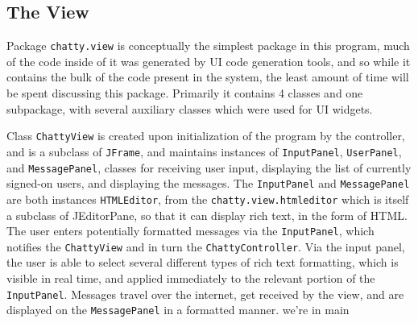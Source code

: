 \documentclass[oneside,article]{memoir}
\begin{document}
\subsection{The View}
\label{theview}

Package \texttt{chatty.view} is conceptually the simplest package in this
program, much of the code inside of it was generated by UI code
generation tools, and so while it contains the bulk of the code
present in the system, the least amount of time will be spent
discussing this package. Primarily it contains 4 classes and one
subpackage, with several auxiliary classes which were used for UI
widgets.

Class \texttt{ChattyView} is created upon initialization of the program by
the controller, and is a subclass of \texttt{JFrame}, and maintains instances
of \texttt{InputPanel}, \texttt{UserPanel}, and \texttt{MessagePanel}, classes for
receiving user input, displaying the list of currently signed-on
users, and displaying the messages. The \texttt{InputPanel} and
\texttt{MessagePanel} are both instances \texttt{HTMLEditor}, from the
\texttt{chatty.view.htmleditor} which is itself a subclass of JEditorPane, so
that it can display rich text, in the form of HTML. The user enters
potentially formatted messages via the \texttt{InputPanel}, which notifies
the \texttt{ChattyView} and in turn the \texttt{ChattyController}. Via the input
panel, the user is able to select several different types of rich text
formatting, which is visible in real time, and applied immediately to
the relevant portion of the \texttt{InputPanel}. Messages travel over the
internet, get received by the view, and are displayed on the
\texttt{MessagePanel} in a formatted manner. 
\if@mainmatter
we're in main
\backmatter
\fi
\end{document}
